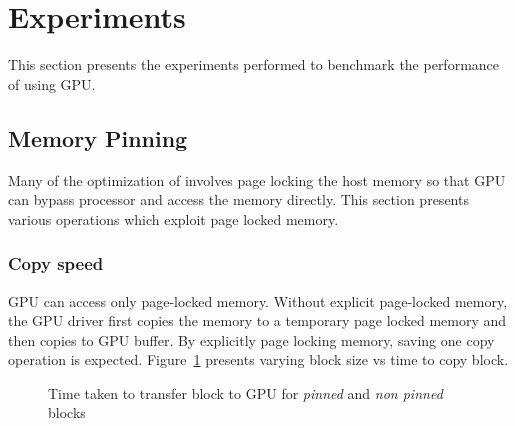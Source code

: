 \section{Experiments}
This section presents the experiments performed to benchmark the performance of
using GPU.
\subsection{Memory Pinning}
Many of the optimization of involves page locking the host memory so that GPU can
bypass processor and access the memory directly. This section presents various
operations which exploit page locked memory.
\subsubsection{Copy speed}
GPU can access only page-locked memory. Without explicit page-locked memory, the
GPU driver first copies the memory to a temporary page locked memory and then copies
to GPU buffer. By explicitly page locking memory, saving one copy operation is expected.
Figure~\ref{fig:mempin_block_copy} presents varying block size vs time to
copy block.

\begin{figure}[h]
  
  \caption{Time taken to transfer block to GPU for \textit{pinned} and \textit{non pinned} blocks}
  \label{fig:mempin_block_copy}
\end{figure}

